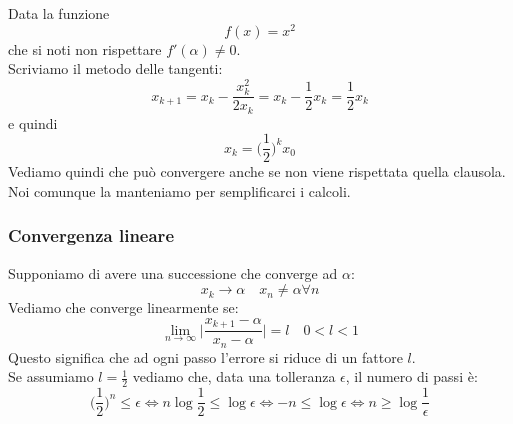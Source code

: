 \begin{example}
	Data la funzione
	\begin{equation*}
		f(x)=x^2
	\end{equation*}
	che si noti non rispettare $f'(\alpha)\neq 0$. \\
	Scriviamo il metodo delle tangenti:
	\begin{equation*}
		x_{k+1}=x_k - \frac{x_k^2}{2x_k}=x_k-\frac{1}{2}x_k=\frac{1}{2}x_k
	\end{equation*}
	e quindi
	\begin{equation*}
		x_k=\bigg(\frac{1}{2}\bigg)^k x_0
	\end{equation*}
	Vediamo quindi che può convergere anche se non viene rispettata quella clausola. Noi comunque la manteniamo per semplificarci i calcoli.
\end{example}

\subsubsection{Convergenza lineare}
Supponiamo di avere una successione che converge ad $\alpha$:
\begin{equation*}
	x_k \to \alpha \quad x_n \neq \alpha \forall n
\end{equation*}
Vediamo che converge linearmente se:
\begin{equation*}
	\lim_{n \to \infty} \lvert \frac{x_{k+1}-\alpha}{x_{n}-\alpha}\rvert = l \quad 0 < l < 1
\end{equation*}
Questo significa che ad ogni passo l'errore si riduce di un fattore $l$.\\
Se assumiamo $l=\frac{1}{2}$ vediamo che, data una tolleranza $\epsilon$, il numero di passi è:
\begin{equation*}
	\bigg(\frac{1}{2}\bigg)^n \leq \epsilon \Leftrightarrow n \log \frac{1}{2} \leq \log \epsilon \Leftrightarrow -n \leq \log \epsilon \Leftrightarrow n \geq \log \frac{1}{\epsilon}
\end{equation*}

